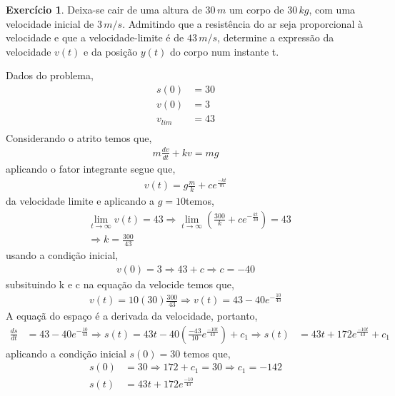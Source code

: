 \documentclass[a4paper,12pt,reqno,natbib]{amsart}
\theoremstyle{definition}
\newtheorem{exercise}{Exerc\'icio}
\begin{document}
\begin{exercise}
Deixa-se cair de uma altura de $30\,m$ um corpo de $30\,kg$, com uma velocidade inicial de $3\,m/s$. Admitindo que a
resistência do ar seja proporcional à velocidade e que a velocidade-limite é de $43\,m/s$, determine a expressão da
velocidade $v(t)$ e da posição $y(t)$ do corpo num instante t.\\
\end{exercise}
Dados do problema,
\begin{align*}
	s(0) & = 30 \\
	v(0) & = 3 \\
	v_{lim} & = 43 \\
\end{align*}
Considerando o atrito temos que,
\begin{align*}
	m\frac{dv}{dt} + kv = mg
\end{align*}
aplicando o fator integrante segue que,
\begin{align*}
	v(t) = g\frac{m}{k} + ce^{\frac{-kt}{m}}
\end{align*}
da velocidade limite e aplicando a $g = 10$temos,
\begin{align*}
	&\lim_{t\rightarrow\infty}v(t) = 43 \Rightarrow  \lim_{t\rightarrow\infty}\left (\frac{300}{k} +
	c e^{-\frac{kt}{30}}\right ) = 43 \\ 
	&\Rightarrow k = \frac{300}{43}
\end{align*}
usando a condi\c c\~ao inicial,
\begin{align*}
	v(0) = 3 \Rightarrow 43 + c \Rightarrow c = -40
\end{align*}
subsituindo k e c na equa\c c\~ao da velocide temos que,
\begin{align*}
	v(t) = 10(30)\frac{300}{43} \Rightarrow  v(t) = 43 - 40e^{-\frac{10}{43}}
\end{align*}
A equa\c c\~a do espa\c co \'e a derivada da velocidade, portanto,
\begin{align*}
	\frac{ds}{dt} &= 43 - 40e^{-\frac{10}{43}} \Rightarrow s(t) = 43t - 40\left (\frac{-43}{10}
	e^{\frac{-10t}{43}}\right ) + c_1 \Rightarrow 
	s(t) &= 43t + 172e^{\frac{-10t}{43}} + c_1
\end{align*}
aplicando a condi\c c\~ao inicial $s(0) = 30$ temos que,
\begin{align*}
	s(0) &= 30 \Rightarrow 172 + c_1 = 30 \Rightarrow c_1 = -142 \\
	s(t) &= 43t + 172e^{\frac{-10}{43}} 
\end{align*}
\vspace{0.6 cm}
\end{document}
